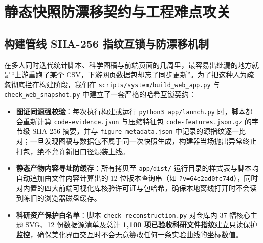 \section{静态快照防漂移契约与工程难点攻关}\label{sec:contracts-challenges}

\subsection{构建管线 SHA-256 指纹互锁与防漂移机制}

在多人同时迭代统计脚本、科学图稿与前端页面的几周里，最容易出纰漏的地方就是“上游重跑了某个 CSV，下游网页数据包却忘了同步更新”。为了把这种人为疏忽彻底拦在构建阶段，我们在 \texttt{scripts/system/build\_web\_app.py} 与 \texttt{check\_web\_snapshot.py} 中建立了一套严格的哈希互锁契约：

\begin{itemize}
  \item \textbf{图证同源强校验}：每次执行构建或运行 \texttt{python3 app/launch.py} 时，脚本都会重新计算 \texttt{code-evidence.json} 与压缩特征包 \texttt{code-features.json.gz} 的字节级 SHA-256 摘要，并与 \texttt{figure-metadata.json} 中记录的源指纹逐一比对；一旦发现图稿与数据包不属于同一次快照生成，构建器当场抛出异常终止打包，绝不允许新旧口径混装上线。
  \item \textbf{静态产物内容寻址防缓存}：所有拷贝至 \texttt{app/dist/} 运行目录的样式表与脚本均自动追加由文件内容计算出的 12 位版本查询串（如 \texttt{?v=64c2ad0fc74d}），同时对内置的四大前端可视化库核验许可证与包哈希，确保本地离线打开时不会读到陈旧的浏览器磁盘缓存。
  \item \textbf{科研资产保护白名单}：脚本 \texttt{check\_reconstruction.py} 对仓库内 37 幅核心主题 SVG、12 份数据源清单及总计 \textbf{1,100 项已验收科研文件指纹}建立只读保护监控，确保美化界面交互时不会无意篡改任何一条实验曲线的坐标数值。
\end{itemize}
